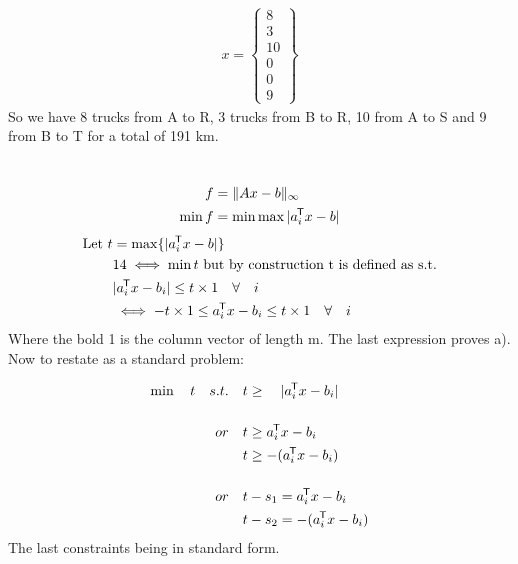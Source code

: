 \documentclass{article}
\DeclarePairedDelimiter{\norm}{\lVert}{\rVert}
\newcommand*{\tran}{^{\mkern-1.5mu\mathsf{T}}}%
\begin{document}
	 \begin{align}
	 x = 
	 \begin{Bmatrix} 8 \\ 3 \\ 10 \\0 \\0 \\9   	\end{Bmatrix}
	 \end{align}
	 So we have 8 trucks from A to R, 3 trucks from B to R, 10 from A to S and 9 from B to T for a total of 191 km.
	 
	 \clearpage
	 
	 \section{}
	 
	 \begin{align}
	 	f &= \norm{Ax-b}_\infty \\
	 \min f	&= \min \max{\vert a_i\tran x-b \vert }\\
	 \end{align}
	 \begin{align*}
	 	\text{Let } t &= \max \{\vert a_i \tran x - b \vert \}\\
	 	&14 \iff  \min t \text{ but by construction t is defined as s.t.}\\
	 	&\vert a_i\tran x - b_i \vert \le t \times \boldmath{1} \quad \forall \quad i\\
	 	&\iff -t  \times \boldmath{1} \le a_i\tran x - b_i \le t \times \boldmath{1} \quad  \forall \quad i
	 \end{align*}
	 Where the bold 1 is the column vector of length m. The last expression proves a). Now to restate as a standard problem:
	 
	 \begin{align*}
	 	\min \quad t \quad s.t. \quad &t \ge \quad \vert a_i\tran x - b_i \vert\\[3ex] or \quad 
	 	& t \ge a_i\tran x - b_i\\
	 	& t \ge -(a_i\tran x - b_i)\\[3ex]
	 	or \quad & t - s_1 =  a_i\tran x - b_i\\
	 	         & t - s_2 = -(a_i\tran x - b_i)
	 \end{align*}
	 The last constraints being in standard form.
	
	
	
	
	
	
	
	
	
	
\end{document}
